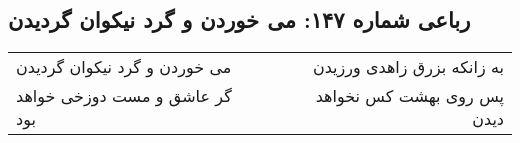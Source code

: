 \begin{center}
\section*{رباعی شماره ۱۴۷: می خوردن و گرد نیکوان گردیدن}
\label{sec:sh147}
\begin{longtable}{l p{0.5cm} r}
می خوردن و گرد نیکوان گردیدن
&&
به زانکه بزرق زاهدی ورزیدن
\\
گر عاشق و مست دوزخی خواهد بود
&&
پس روی بهشت کس نخواهد دیدن
\\
\end{longtable}
\end{center}
